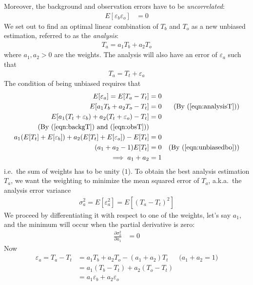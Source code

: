 Moreover, the background and observation errors have to be \textit{uncorrelated}:
\begin{align}
E[\varepsilon_b\varepsilon_o] &= 0 \label{eqn:bouncorr}
\end{align}
We set out to find an optimal linear combination of $T_b$ and $T_o$ as a new unbiased estimation, referred to as the \textit{analysis}:
\begin{align}
T_a = a_1T_b + a_2T_o \label{eqn:analysisT}
\end{align}
where $a_1, a_2 > 0$ are the weights. The analysis will also have an error of $\varepsilon_a$ such that 
\begin{align}
T_a = T_t + \varepsilon_a
\end{align}
The condition of being unbiased requires that
\begin{align}
E[\varepsilon_a] = E[T_a - T_t] &= 0 \nonumber \\
E[a_1T_b + a_2T_o - T_t] &= 0 \nonumber &\text{(By (\ref{eqn:analysisT}))}\\
E[a_1(T_t + \varepsilon_b) + a_2(T_t + \varepsilon_o) - T_t] &= 0 \nonumber\\
\text{(By (\ref{eqn:backgT}) and (\ref{eqn:obsT}))} &\nonumber \\
a_1(E[T_t] + E[\varepsilon_b]) + a_2(E[T_t] + E[\varepsilon_o]) - E[T_t] &= 0 \nonumber \\
(a_1 + a_2 - 1)E[T_t] &= 0 &\text{(By (\ref{eqn:unbiasedbo}))} \nonumber \\
\implies a_1 + a_2 &= 1
\end{align}
i.e.\ the sum of weights has to be unity ($1$). To obtain the best analysis estimation $T_a$, we want the weighting to minimize the mean squared error of $T_a$, a.k.a.\ the analysis error variance 
\begin{align}
\sigma_a^2 = E[\varepsilon_a^2] = E[(T_a - T_t)^2]
\end{align}
We proceed by differentiating it with respect to one of the weights, let's say $a_1$, and the minimum will occur when the partial derivative is zero:
\begin{align}
\frac{\partial \sigma_a^2}{\partial a_1} &= 0 \label{eqn:DAunimin}
\end{align}
Now
\begin{align}
\varepsilon_a = T_a - T_t &= a_1T_b + a_2T_o - (a_1 + a_2)T_t & \text{($a_1 + a_2 = 1$)}\nonumber \\
&= a_1(T_b-T_t) + a_2(T_o-T_t) \nonumber \\
&= a_1\varepsilon_b + a_2\varepsilon_o
\end{align}
